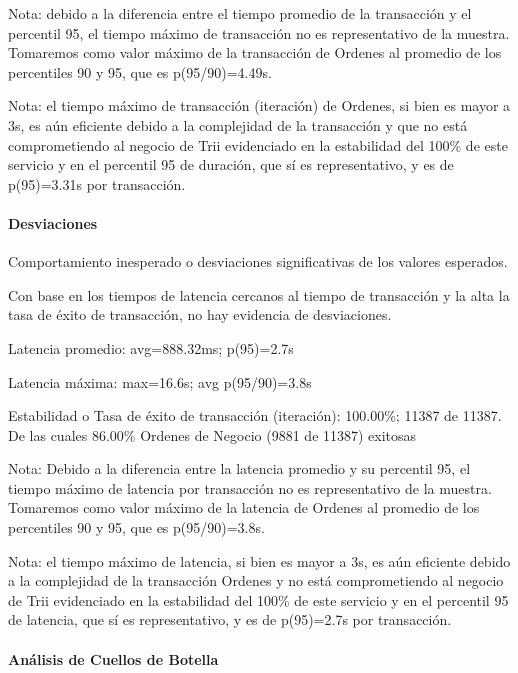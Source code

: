 \documentclass[
  paper=a4,
  ,captions=tableheading
]{scrartcl}
\renewenvironment{quote}{\begin{customblockquote}\list{}{\rightmargin=0em\leftmargin=0em}%
\item\relax\color{blockquote-text}\ignorespaces}{\unskip\unskip\endlist\end{customblockquote}}
\begin{document}
Nota: debido a la diferencia entre el tiempo promedio de la transacción
y el percentil 95, el tiempo máximo de transacción no es representativo
de la muestra. Tomaremos como valor máximo de la transacción de Ordenes
al promedio de los percentiles 90 y 95, que es p(95/90)=4.49s.

Nota: el tiempo máximo de transacción (iteración) de Ordenes, si bien es
mayor a 3s, es aún eficiente debido a la complejidad de la transacción y
que no está comprometiendo al negocio de Trii evidenciado en la
estabilidad del 100\% de este servicio y en el percentil 95 de duración,
que sí es representativo, y es de p(95)=3.31s por transacción.

\paragraph{Desviaciones}\label{sec:desviaciones-2}

Comportamiento inesperado o desviaciones significativas de los valores
esperados.

Con base en los tiempos de latencia cercanos al tiempo de transacción y
la alta la tasa de éxito de transacción, no hay evidencia de
desviaciones.

\begin{quote}
Latencia promedio: avg=888.32ms; p(95)=2.7s

Latencia máxima: max=16.6s; avg p(95/90)=3.8s

Estabilidad o Tasa de éxito de transacción (iteración): 100.00\%; 11387
de 11387. De las cuales 86.00\% Ordenes de Negocio (9881 de 11387)
exitosas
\end{quote}

Nota: Debido a la diferencia entre la latencia promedio y su percentil
95, el tiempo máximo de latencia por transacción no es representativo de
la muestra. Tomaremos como valor máximo de la latencia de Ordenes al
promedio de los percentiles 90 y 95, que es p(95/90)=3.8s.

Nota: el tiempo máximo de latencia, si bien es mayor a 3s, es aún
eficiente debido a la complejidad de la transacción Ordenes y no está
comprometiendo al negocio de Trii evidenciado en la estabilidad del
100\% de este servicio y en el percentil 95 de latencia, que sí es
representativo, y es de p(95)=2.7s por transacción.

\paragraph{Análisis de Cuellos de
Botella}\label{sec:anuxe1lisis-de-cuellos-de-botella-2}
\end{document}
